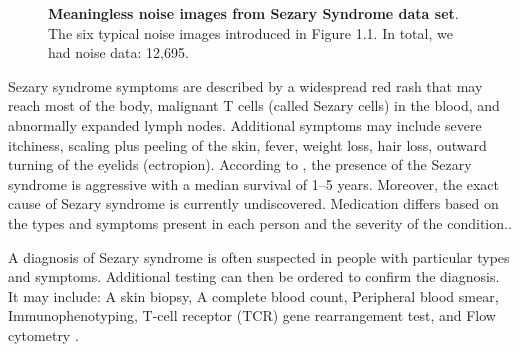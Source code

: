 \begin{figure}[ht]
\begin{center}
\begin{subfigure}[b]{0.25\textwidth}
			\label{fig:Good Cell}
		\end{subfigure}
	\end{center}
	\caption{\textbf{Meaningless noise images from Sezary Syndrome data set}.  The six typical noise images introduced in Figure 1.1. In total, we had noise data: 12,695.}
	\label{fig:lennas}
\end{figure}

Sezary syndrome symptoms are described by a widespread red rash that may reach most of the body, malignant T cells (called Sezary cells) in the blood, and abnormally expanded lymph nodes. Additional symptoms may include severe itchiness, scaling plus peeling of the skin, fever, weight loss, hair loss, outward turning of the eyelids (ectropion). According to \cite{10.1182/blood-2004-09-3502}\cite{20001195667}, the presence of the Sezary syndrome is aggressive with a median survival of 1–5 years. Moreover, the exact cause of Sezary syndrome is currently undiscovered. Medication differs based on the types and symptoms present in each person and the severity of the condition.\cite{Yamashita}.

A diagnosis of Sezary syndrome is often suspected in people with particular types and symptoms. Additional testing can then be ordered to confirm the diagnosis. It may include: A skin biopsy, A complete blood count, Peripheral blood smear, Immunophenotyping, T-cell receptor (TCR) gene rearrangement test, and Flow cytometry \cite{Alain}.



